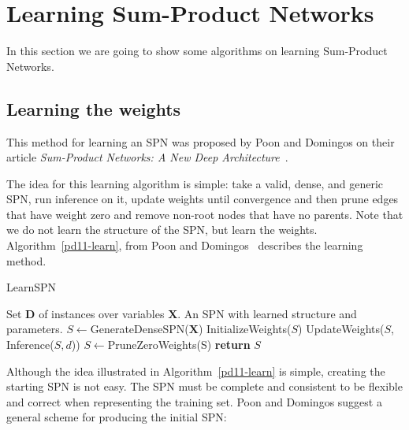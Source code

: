 \documentclass[a4paper,10pt]{article}
\theoremstyle{plain}
\begin{document}
\section{Learning Sum-Product Networks}

In this section we are going to show some algorithms on learning Sum-Product Networks.

\subsection{Learning the weights}

This method for learning an SPN was proposed by Poon and Domingos on their article
\textit{Sum-Product Networks: A New Deep Architecture}~\cite{poon-domingos}.

The idea for this learning algorithm is simple: take a valid, dense, and generic SPN, run inference
on it, update weights until convergence and then prune edges that have weight zero and remove
non-root nodes that have no parents. Note that we do not learn the structure of the SPN, but learn
the weights. Algorithm~\ref{pd11-learn}, from Poon and Domingos~\cite{poon-domingos} describes the
learning method.

\begin{algorithm}
  \caption{LearnSPN}\label{pd11-learn}
  \begin{algorithmic}[1]
    \Require Set $\mathbf{D}$ of instances over variables $\mathbf{X}$.
    \Ensure An SPN with learned structure and parameters.
    \State $S \gets $GenerateDenseSPN($\mathbf{X}$)
    \State InitializeWeights($S$)
    \Repeat
      \State UpdateWeights($S$, Inference($S,d$))
      \EndFor
    \State $S \gets $PruneZeroWeights(S)
    \State \textbf{return} $S$
  \end{algorithmic}
\end{algorithm}

Although the idea illustrated in Algorithm~\ref{pd11-learn} is simple, creating the starting SPN is
not easy. The SPN must be complete and consistent to be flexible and correct when representing the
training set. Poon and Domingos suggest a general scheme for producing the initial
SPN\@:
\end{document}
